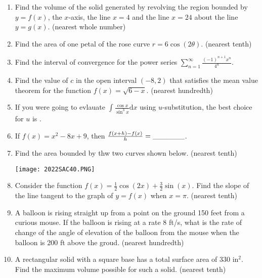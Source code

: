 \documentclass[../uilmath.tex]{subfiles}
\begin{document}
\begin{enumerate}[label=\bfseries\arabic*.]
    \item %
    Find the volume of the solid generated by revolving the region bounded by $y=f(x)$, the $x$-axis, the line $x=4$ and 
    the line $x=24$ about the line $y=g(x)$. (nearest whole number)

    \item %
    Find the area of one petal of the rose curve $r=6\cos(2\theta)$. (nearest tenth)

    \item %
    Find the interval of convergence for the power series $\sum_{n=1}^\infty \frac{(-1)^{n+1}x^n}{4^n}$.

    \item %
    Find the value of $c$ in the open interval $(-8,2)$ that satisfies the mean value theorem for the function 
    $f(x)=\sqrt{6-x}$. (nearest hundredth)

    \item %
    If you were going to evlauate $\int \frac{\cos x}{\sin^3 x}\mathrm{d}x$ using $u$-substitution, the best choice for $u$ is \blank.

    \item %
    If $f(x)=x^2-8x+9$, then $\frac{f(x+h)-f(x)}{h}=\_\_\_\_\_\_$.

    \item %
    Find the area bounded by thw two curves shown below. (nearest tenth)
    \begin{center}
        \texttt{[image: 2022SAC40.PNG]}
    \end{center}

    \item %
    Consider the function $f(x)=\frac{1}{2}\cos(2x)+\frac{3}{2}\sin(x)$. Find the slope of the line tangent to 
    the graph of $y=f(x)$ when $x=\pi$. (nearest tenth)

    \item %
    A balloon is rising straight up from a point on the ground 150 feet from a curious mouse. If the balloon is rising at a 
    rate 8 ft/s, what is the rate of change of the angle of elevation of the balloon from the mouse when the balloon is 200 ft above the groud. (nearest hundredth)

    \item %
    A rectangular solid with a square base has a total surface area of 330 in$^2$. Find the maximum volume possible for such a solid. (nearest tenth)



\end{enumerate}
\end{document}
